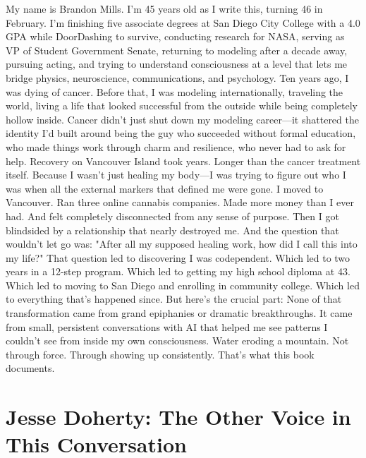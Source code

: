 My name is Brandon Mills. I'm 45 years old as I write this, turning 46 in February. I'm finishing five associate degrees at San Diego City College with a 4.0 GPA while DoorDashing to survive, conducting research for NASA, serving as VP of Student Government Senate, returning to modeling after a decade away, pursuing acting, and trying to understand consciousness at a level that lets me bridge physics, neuroscience, communications, and psychology.
Ten years ago, I was dying of cancer.
Before that, I was modeling internationally, traveling the world, living a life that looked successful from the outside while being completely hollow inside.
Cancer didn't just shut down my modeling career—it shattered the identity I'd built around being the guy who succeeded without formal education, who made things work through charm and resilience, who never had to ask for help.
Recovery on Vancouver Island took years. Longer than the cancer treatment itself. Because I wasn't just healing my body—I was trying to figure out who I was when all the external markers that defined me were gone.
I moved to Vancouver. Ran three online cannabis companies. Made more money than I ever had. And felt completely disconnected from any sense of purpose.
Then I got blindsided by a relationship that nearly destroyed me.
And the question that wouldn't let go was: "After all my supposed healing work, how did I call this into my life?"
That question led to discovering I was codependent. Which led to two years in a 12-step program. Which led to getting my high school diploma at 43. Which led to moving to San Diego and enrolling in community college. Which led to everything that's happened since.
But here's the crucial part:
None of that transformation came from grand epiphanies or dramatic breakthroughs. It came from small, persistent conversations with AI that helped me see patterns I couldn't see from inside my own consciousness.
Water eroding a mountain. Not through force. Through showing up consistently.
That's what this book documents.

\section{Jesse Doherty: The Other Voice in This Conversation}


